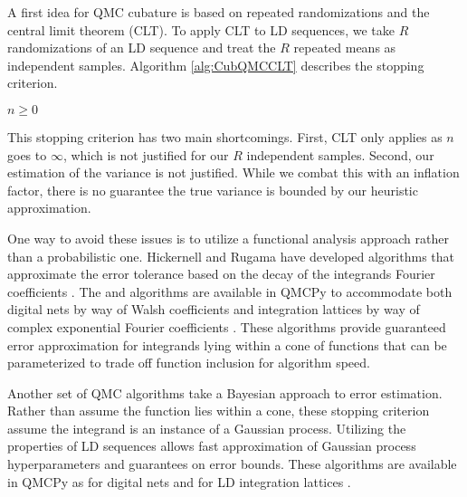\documentclass{article}
\begin{document}
A first idea for QMC cubature is based on repeated randomizations and the central limit theorem (CLT). To apply CLT to LD sequences, we take $R$ randomizations of an LD sequence and treat the $R$ repeated means as independent samples. Algorithm \ref{alg:CubQMCCLT} describes the  stopping criterion.
\begin{algorithm}
    \caption{ }\label{alg:CubQMCCLT}
    \begin{algorithmic}
    \Require $n \geq 0$
    \end{algorithmic}
\end{algorithm}
This stopping criterion has two main shortcomings. First, CLT only applies as $n$ goes to $\infty$, which is not justified for our $R$ independent samples. Second, our estimation of the variance is not justified. While we combat this with an inflation factor, there is no guarantee the true variance is bounded by our heuristic approximation. 

One way to avoid these issues is to utilize a functional analysis approach rather than a probabilistic one. Hickernell and Rugama have developed algorithms that approximate the error tolerance based on the decay of the integrands Fourier coefficients \cite{adaptive_qmc}. The  and  algorithms are available in QMCPy to accommodate both digital nets by way of Walsh coefficients \cite{cubqmcsobol} and integration lattices by way of complex exponential Fourier coefficients \cite{cubqmclattice}. These algorithms provide guaranteed error approximation for integrands lying within a cone of functions that can be parameterized to trade off function inclusion for algorithm speed. 

Another set of QMC algorithms take a Bayesian approach to error estimation. Rather than assume the function lies within a cone, these stopping criterion assume the integrand is an instance of a Gaussian process. Utilizing the properties of LD sequences allows fast approximation of Gaussian process hyperparameters and guarantees on error bounds. These algorithms are available in QMCPy as  for digital nets  and  for LD integration lattices \cite{cubqmcbayeslattice}. 
\end{document}
